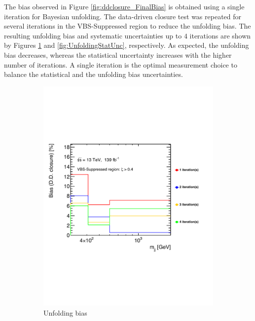 The bias observed in Figure \ref{fig:ddclosure_FinalBias} is obtained using a single iteration for Bayesian unfolding. The data-driven closure test was repeated for several iterations in the VBS-Suppressed region to reduce the unfolding bias. The resulting unfolding bias and systematic uncertainties up to $4$ iterations are shown by Figures \ref{fig:UnfoldingBiasIteration} and \ref{fig:UnfoldingStatUnc}, respectively. As expected, the unfolding bias decreases, whereas the statistical uncertainty increases with the higher number of iterations. A single iteration is the optimal measurement choice to balance the statistical and the unfolding bias uncertainties.

\begin{figure}[htb]
    \centering
    \begin{subfigure}{.49\textwidth}
        \centering
        \includegraphics[width=.92\linewidth]{figures/Analysis/Unfolding/UnfoldingBiasIteration_Sup.pdf}
       \caption{ Unfolding bias \label{fig:UnfoldingBiasIteration} }
    \end{subfigure}
    \begin{subfigure}{.49\textwidth}

\end{subfigure}
\end{figure}
